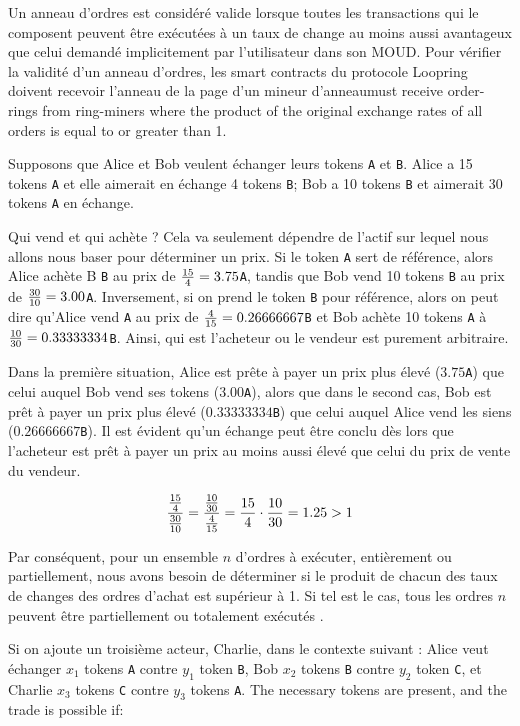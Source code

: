 \documentclass[UTF8,nofonts]{article}
\begin{document}
\begin{multicols}{2}
Un anneau d'ordres est considéré valide lorsque toutes les transactions qui le composent peuvent être exécutées à un taux de change au moins aussi avantageux que celui demandé implicitement par l'utilisateur dans son MOUD. Pour vérifier la validité d'un anneau d'ordres, les smart contracts du protocole Loopring doivent recevoir l'anneau de la page d'un mineur d'anneaumust receive order-rings from ring-miners where the product of the original exchange rates of all orders is equal to or greater than 1.

Supposons que Alice et Bob veulent échanger leurs tokens \verb|A| et \verb|B|. Alice a 15 tokens \verb|A| et elle aimerait en échange 4 tokens \verb|B|; Bob a 10 tokens \verb|B| et aimerait 30 tokens \verb|A| en échange.

Qui vend et qui achète ? Cela va seulement dépendre de l'actif sur lequel nous allons nous baser pour déterminer un prix. Si le token \verb|A| sert de référence, alors Alice achète B \verb|B| au prix de ${15 \over 4} = 3.75$\verb|A|, tandis que Bob vend 10 tokens \verb|B| au prix de  ${30 \over 10} = 3.00$\verb|A|. Inversement, si on prend le token \verb|B| pour référence, alors on peut dire qu'Alice vend \verb|A| au prix de ${4\over 15}=0.26666667$\verb|B| et Bob achète 10 tokens \verb|A| à ${10 \over 30}=0.33333334$\verb|B|. Ainsi, qui est l'acheteur ou le vendeur est purement arbitraire.

Dans la première situation, Alice est prête à payer un prix plus élevé ($3.75$\verb|A|) que celui auquel Bob vend ses tokens ($3.00$\verb|A|), alors que dans le second cas, Bob est prêt à payer un prix plus élevé ($0.33333334$\verb|B|) que celui auquel Alice vend les siens ($0.26666667$\verb|B|). Il est évident qu'un échange peut être conclu dès lors que l'acheteur est prêt à payer un prix au moins aussi élevé que celui du prix de vente du vendeur.

\begin{equation}
{{15\over 4} \over {30\over 10}} = {{10\over 30} \over {4\over 15}}={15 \over 4} \cdot {10 \over 30} = 1.25 > 1
\end{equation}

Par conséquent, pour un ensemble $n$ d'ordres à exécuter, entièrement ou partiellement, nous avons besoin de déterminer si le produit de chacun des taux de changes des ordres d'achat est supérieur à 1. Si tel est le cas, tous les ordres $n$ peuvent être partiellement ou totalement exécutés \cite{supersymmetry}.

Si on ajoute un troisième acteur, Charlie, dans le contexte suivant : Alice veut échanger $x_1$ tokens \verb|A| contre $y_1$ token \verb|B|, Bob $x_2$ tokens \verb|B| contre $y_2$ token \verb|C|, et Charlie $x_3$ tokens \verb|C| contre $y_3$ tokens \verb|A|. The necessary tokens are present, and the trade is possible if:


\end{multicols}
\end{document}
